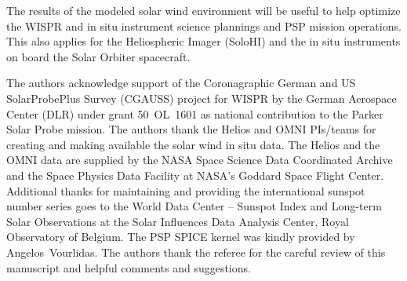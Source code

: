 \documentclass[]{aa}
\begin{document}
	The results of the modeled solar wind environment will be useful to help optimize the WISPR and in situ instrument science plannings and PSP mission operations. This also applies for the Heliospheric Imager (SoloHI) \citep{Howard2013} and the in situ instruments on board the Solar Orbiter spacecraft.

	\begin{acknowledgements}
		The authors acknowledge support of the Coronagraphic German and US SolarProbePlus Survey (CGAUSS) project for WISPR by the German Aerospace Center (DLR) under grant 50~OL~1601 as national contribution to the Parker Solar Probe mission. The authors thank the Helios and OMNI PIs/teams for creating and making available the solar wind in situ data. The Helios and the OMNI data are supplied by the NASA Space Science Data Coordinated Archive and the Space Physics Data Facility at NASA's Goddard Space Flight Center. Additional thanks for maintaining and providing the international sunspot number series goes to the World Data Center -- Sunspot Index and Long-term Solar Observations at the Solar Influences Data Analysis Center, Royal Observatory of Belgium. The PSP SPICE kernel was kindly provided by Angelos~Vourlidas. The authors thank the referee for the careful review of this manuscript and helpful comments and suggestions.
	\end{acknowledgements}

	
	
\end{document}
